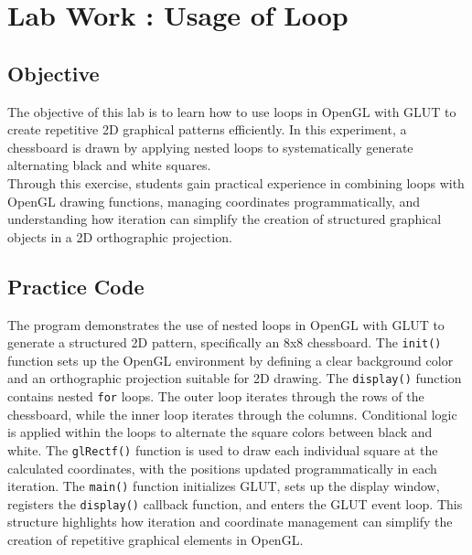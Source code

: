\documentclass[12pt]{article}
\begin{document}
\tableofcontents
\thispagestyle{empty}
\clearpage
{}

\section{Lab Work : Usage of Loop}
\subsection{Objective}
The objective of this lab is to learn how to use loops in OpenGL with GLUT to create repetitive 2D graphical patterns efficiently. In this experiment, a chessboard is drawn by applying nested loops to systematically generate alternating black and white squares.  \\
Through this exercise, students gain practical experience in combining loops with OpenGL drawing functions, managing coordinates programmatically, and understanding how iteration can simplify the creation of structured graphical objects in a 2D orthographic projection.

\subsection{Practice Code}
The program demonstrates the use of nested loops in OpenGL with GLUT to generate a structured 2D pattern, specifically an 8x8 chessboard. 
The \texttt{init()} function sets up the OpenGL environment by defining a clear background color and an orthographic projection suitable for 2D drawing. 
The \texttt{display()} function contains nested \texttt{for} loops. The outer loop iterates through the rows of the chessboard, while the inner loop iterates through the columns. Conditional logic is applied within the loops to alternate the square colors between black and white. The \texttt{glRectf()} function is used to draw each individual square at the calculated coordinates, with the positions updated programmatically in each iteration.
The \texttt{main()} function initializes GLUT, sets up the display window, registers the \texttt{display()} callback function, and enters the GLUT event loop. This structure highlights how iteration and coordinate management can simplify the creation of repetitive graphical elements in OpenGL. \\
\end{document}
